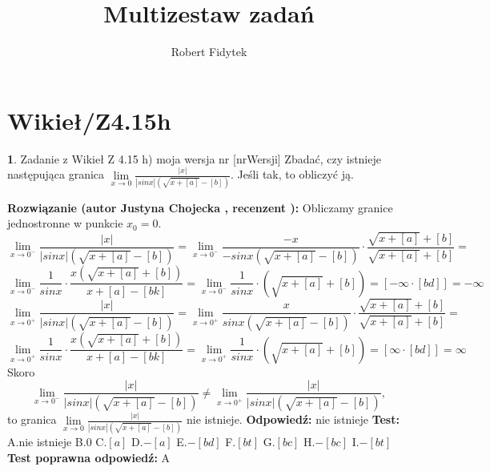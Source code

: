 \documentclass[12pt, a4paper]{article}
\title{Multizestaw zadań}
\author{Robert Fidytek}
\date{}
\theoremstyle{definition} %
\newtheorem{zad}{}
\newcommand{\kategoria}[1]{\section{#1}} %
\newcommand{\zadStart}[1]{\begin{zad}#1\newline} %
\newcommand{\zadStop}{\end{zad}}   %
\newcommand{\rozwStart}[2]{\noindent \textbf{Rozwiązanie (autor #1 , recenzent #2): }\newline} %
\newcommand{\rozwStop}{\newline}                                            %
\newcommand{\odpStart}{\noindent \textbf{Odpowiedź:}\newline}    %
\newcommand{\odpStop}{\newline}                                             %
\newcommand{\testStart}{\noindent \textbf{Test:}\newline} %
\newcommand{\testStop}{\newline} %
\newcommand{\kluczStart}{\noindent \textbf{Test poprawna odpowiedź:}\newline} %
\newcommand{\kluczStop}{\newline} %
\begin{document}
\maketitle


\kategoria{Wikieł/Z4.15h}
\zadStart{Zadanie z Wikieł Z 4.15 h) moja wersja nr [nrWersji]}
Zbadać, czy istnieje następująca granica $\lim\limits_{x\to 0}\frac{|x|}{|sinx|\left(\sqrt{x+[a]}-[b]\right)}$. Jeśli tak, to obliczyć ją.
\zadStop
\rozwStart{Justyna Chojecka}{}
Obliczamy granice jednostronne w punkcie $x_{0}=0$.
$$\lim\limits_{x\to 0^{-}}\frac{|x|}{|sinx|\left(\sqrt{x+[a]}-[b]\right)}=\lim\limits_{x\to 0^{-}}\frac{-x}{-sinx\left(\sqrt{x+[a]}-[b]\right)}\cdot \frac{\sqrt{x+[a]}+[b]}{\sqrt{x+[a]}+[b]}=$$$$\lim\limits_{x\to 0^{-}}\frac{1}{sinx}\cdot\frac{x\left(\sqrt{x+[a]}+[b]\right)}{x+[a]-[bk]}=\lim\limits_{x\to 0^{-}}\frac{1}{sinx}\cdot\left(\sqrt{x+[a]}+[b]\right)=\left[-\infty\cdot[bd]\right]=-\infty$$
$$\lim\limits_{x\to 0^{+}}\frac{|x|}{|sinx|\left(\sqrt{x+[a]}-[b]\right)}=\lim\limits_{x\to 0^{+}}\frac{x}{sinx\left(\sqrt{x+[a]}-[b]\right)}\cdot \frac{\sqrt{x+[a]}+[b]}{\sqrt{x+[a]}+[b]}=$$$$\lim\limits_{x\to 0^{+}}\frac{1}{sinx}\cdot\frac{x\left(\sqrt{x+[a]}+[b]\right)}{x+[a]-[bk]}=\lim\limits_{x\to 0^{+}}\frac{1}{sinx}\cdot\left(\sqrt{x+[a]}+[b]\right)=\left[\infty\cdot[bd]\right]=\infty$$
Skoro 
$$\lim\limits_{x\to 0^{-}}\frac{|x|}{|sinx|\left(\sqrt{x+[a]}-[b]\right)}\neq \lim\limits_{x\to 0^{+}}\frac{|x|}{|sinx|\left(\sqrt{x+[a]}-[b]\right)},$$
to granica $\lim\limits_{x\to 0}\frac{|x|}{|sinx|\left(\sqrt{x+[a]}-[b]\right)}$ nie istnieje.
\rozwStop
\odpStart
nie istnieje
\odpStop
\testStart
A.nie istnieje
B.0
C.$[a]$
D.$-[a]$
E.$-[bd]$
F.$[bt]$
G.$[bc]$
H.$-[bc]$
I.$-[bt]$
\testStop
\kluczStart
A
\kluczStop
\end{document}
